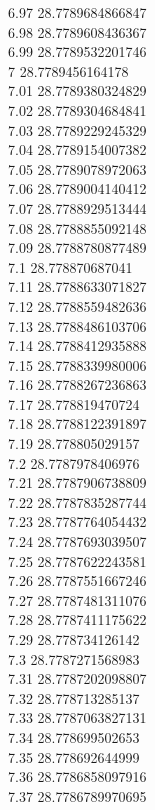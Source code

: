{6.97	28.7789684866847\\
6.98	28.7789608436367\\
6.99	28.7789532201746\\
7	28.7789456164178\\
7.01	28.7789380324829\\
7.02	28.7789304684841\\
7.03	28.7789229245329\\
7.04	28.7789154007382\\
7.05	28.7789078972063\\
7.06	28.7789004140412\\
7.07	28.7788929513444\\
7.08	28.7788855092148\\
7.09	28.7788780877489\\
7.1	28.778870687041\\
7.11	28.7788633071827\\
7.12	28.7788559482636\\
7.13	28.7788486103706\\
7.14	28.7788412935888\\
7.15	28.7788339980006\\
7.16	28.7788267236863\\
7.17	28.778819470724\\
7.18	28.7788122391897\\
7.19	28.778805029157\\
7.2	28.7787978406976\\
7.21	28.7787906738809\\
7.22	28.7787835287744\\
7.23	28.7787764054432\\
7.24	28.7787693039507\\
7.25	28.7787622243581\\
7.26	28.7787551667246\\
7.27	28.7787481311076\\
7.28	28.7787411175622\\
7.29	28.778734126142\\
7.3	28.7787271568983\\
7.31	28.7787202098807\\
7.32	28.778713285137\\
7.33	28.7787063827131\\
7.34	28.778699502653\\
7.35	28.778692644999\\
7.36	28.7786858097916\\
7.37	28.7786789970695\\
}

